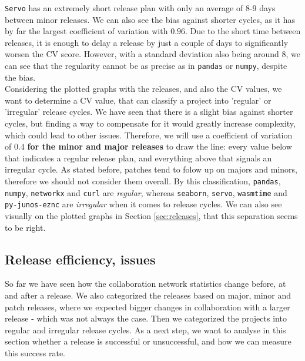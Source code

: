 \texttt{Servo} has an extremely short release plan with only an average of 8-9 days between minor releases. We can also see the bias against shorter cycles, as it has by far the largest coefficient of variation with $0.96$. Due to the short time between releases, it is enough to delay a release by just a couple of days to significantly worsen the CV score. However, with a standard deviation also being around 8, we can see that the regularity cannot be as precise as in \texttt{pandas} or \texttt{numpy}, despite the bias. \\

Considering the plotted graphs with the releases, and also the CV values, we want to determine a CV value, that can classify a project into 'regular' or 'irregular' release cycles. We have seen that there is a slight bias against shorter cycles, but finding a way to compensate for it would greatly increase complexity, which could lead to other issues. Therefore, we will use a coefficient of variation of $0.4$ \textbf{for the minor and major releases} to draw the line: every value below that indicates a regular release plan, and everything above that signals an irregular cycle. As stated before, patches tend to folow up on majors and minors, therefore we should not consider them overall.  By this classification, \texttt{pandas}, \texttt{numpy}, \texttt{networkx} and \texttt{curl} are \textit{regular}, whereas \texttt{seaborn}, \texttt{servo}, \texttt{wasmtime} and \texttt{py-junos-eznc} are \textit{irregular} when it comes to release cycles. We can also see visually on the plotted graphs in Section \ref{sec:releases}, that this separation seems to be right.

\subsection{Release efficiency, issues}

So far we have seen how the collaboration network statistics change before, at and after a release. We also categorized the releases based on major, minor and patch releases, where we expected bigger changes in collaboration with a larger release - which was not always the case. Then we categorized the projects into regular and irregular release cycles. As a next step, we want to analyse in this section whether a release is successful or unsuccessful, and how we can measure this success rate.

